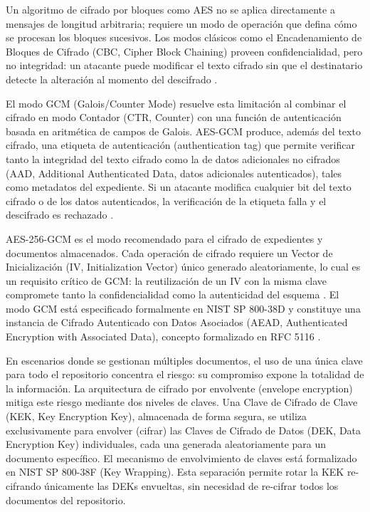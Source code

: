 Un algoritmo de cifrado por bloques como AES no se aplica directamente a mensajes de longitud arbitraria; requiere un modo de operación que defina cómo se procesan los bloques sucesivos. Los modos clásicos como el Encadenamiento de Bloques de Cifrado (CBC, Cipher Block Chaining) proveen confidencialidad, pero no integridad: un atacante puede modificar el texto cifrado sin que el destinatario detecte la alteración al momento del descifrado \cite{dworkin2001a}.

El modo GCM (Galois/Counter Mode) resuelve esta limitación al combinar el cifrado en modo Contador (CTR, Counter) con una función de autenticación basada en aritmética de campos de Galois. AES-GCM produce, además del texto cifrado, una etiqueta de autenticación (authentication tag) que permite verificar tanto la integridad del texto cifrado como la de datos adicionales no cifrados (AAD, Additional Authenticated Data, datos adicionales autenticados), tales como metadatos del expediente. Si un atacante modifica cualquier bit del texto cifrado o de los datos autenticados, la verificación de la etiqueta falla y el descifrado es rechazado \cite{stallings2017,dworkin2007}.

AES-256-GCM es el modo recomendado para el cifrado de expedientes y documentos almacenados. Cada operación de cifrado requiere un Vector de Inicialización (IV, Initialization Vector) único generado aleatoriamente, lo cual es un requisito crítico de GCM: la reutilización de un IV con la misma clave compromete tanto la confidencialidad como la autenticidad del esquema \cite{dworkin2007}. El modo GCM está especificado formalmente en NIST SP 800-38D y constituye una instancia de Cifrado Autenticado con Datos Asociados (AEAD, Authenticated Encryption with Associated Data), concepto formalizado en RFC 5116 \cite{mcgrew2008}.

En escenarios donde se gestionan múltiples documentos, el uso de una única clave para todo el repositorio concentra el riesgo: su compromiso expone la totalidad de la información. La arquitectura de cifrado por envolvente (envelope encryption) mitiga este riesgo mediante dos niveles de claves. Una Clave de Cifrado de Clave (KEK, Key Encryption Key), almacenada de forma segura, se utiliza exclusivamente para envolver (cifrar) las Claves de Cifrado de Datos (DEK, Data Encryption Key) individuales, cada una generada aleatoriamente para un documento específico. El mecanismo de envolvimiento de claves está formalizado en NIST SP 800-38F \cite{dworkin2012} (Key Wrapping). Esta separación permite rotar la KEK re-cifrando únicamente las DEKs envueltas, sin necesidad de re-cifrar todos los documentos del repositorio.

